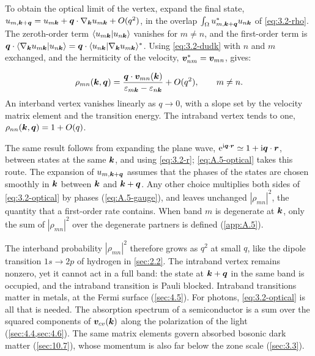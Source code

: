 To obtain the optical limit of the vertex, expand the final state, $u_{m,\bm{k}+\bm{q}} = u_{m\bm{k}} + \bm{q}\cdot\nabla_{\bm{k}}u_{m\bm{k}} + O(q^2)$, in the overlap $\int_\Omega u^*_{m,\bm{k}+\bm{q}}u_{n\bm{k}}$ of \cref{eq:3.2-rho}. The zeroth-order term $\langle u_{m\bm{k}}|u_{n\bm{k}}\rangle$ vanishes for $m \ne n$, and the first-order term is $\bm{q}\cdot\langle\nabla_{\bm{k}}u_{m\bm{k}}|u_{n\bm{k}}\rangle = \bm{q}\cdot\langle u_{n\bm{k}}|\nabla_{\bm{k}}u_{m\bm{k}}\rangle^*$. Using \cref{eq:3.2-dudk} with $n$ and $m$ exchanged, and the hermiticity of the velocity, $\bm{v}^*_{nm} = \bm{v}_{mn}$, gives:
\begin{keyresult}
\begin{equation}
  \rho_{mn}(\bm{k},\bm{q}) = \frac{\bm{q}\cdot\bm{v}_{mn}(\bm{k})}{\varepsilon_{m\bm{k}} - \varepsilon_{n\bm{k}}} + O(q^2), \qquad m \ne n .
  \label{eq:3.2-optical}
\end{equation}
An interband vertex vanishes linearly as $q \to 0$, with a slope set by the velocity matrix element and the transition energy. The intraband vertex tends to one, $\rho_{nn}(\bm{k},\bm{q}) = 1 + O(q)$.
\end{keyresult}
The same result follows from expanding the plane wave, $\mathrm{e}^{\mathrm{i}\bm{q}\cdot\bm{r}} \simeq 1 + \mathrm{i}\bm{q}\cdot\bm{r}$, between states at the same $\bm{k}$, and using \cref{eq:3.2-r}; \cref{eq:A.5-optical} takes this route. The expansion of $u_{m,\bm{k}+\bm{q}}$ assumes that the phases of the states are chosen smoothly in $\bm{k}$ between $\bm{k}$ and $\bm{k} + \bm{q}$. Any other choice multiplies both sides of \cref{eq:3.2-optical} by phases (\cref{eq:A.5-gauge}), and leaves unchanged $|\rho_{mn}|^2$, the quantity that a first-order rate contains. When band $m$ is degenerate at $\bm{k}$, only the sum of $|\rho_{mn}|^2$ over the degenerate partners is defined (\cref{app:A.5}).

The interband probability $|\rho_{mn}|^2$ therefore grows as $q^2$ at small $q$, like the dipole transition $1s \to 2p$ of hydrogen in \cref{sec:2.2}. The intraband vertex remains nonzero, yet it cannot act in a full band: the state at $\bm{k} + \bm{q}$ in the same band is occupied, and the intraband transition is Pauli blocked. Intraband transitions matter in metals, at the Fermi surface (\cref{sec:4.5}). For photons, \cref{eq:3.2-optical} is all that is needed. The absorption spectrum of a semiconductor is a sum over the squared components of $\bm{v}_{cv}(\bm{k})$ along the polarization of the light (\cref{sec:4.4,sec:4.6}). The same matrix elements govern absorbed bosonic dark matter (\cref{sec:10.7}), whose momentum is also far below the zone scale (\cref{sec:3.3}).

